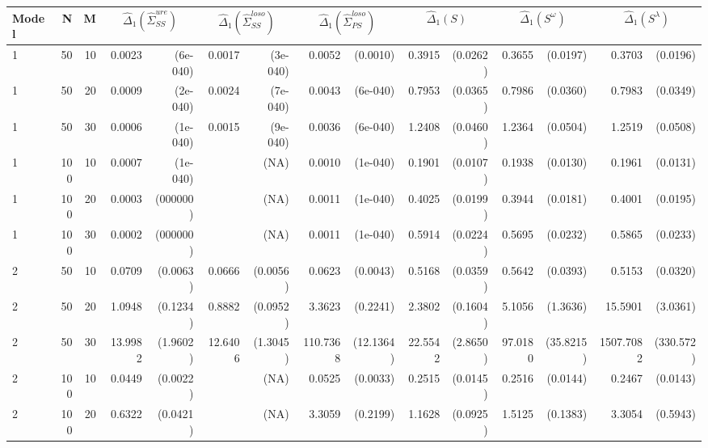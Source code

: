 \begin{table}[ht]
\centering
\begin{small}
\begin{tabular}{lrrrrrrrrrrrrrr}
Model & N & M & \multicolumn{2}{c}{$\hat{\Delta}_1(\hat{\Sigma}^{ure}_{SS})$} &  \multicolumn{2}{c}{$\hat{\Delta}_1(\hat{\Sigma}^{loso}_{SS})$}&  \multicolumn{2}{c}{$\hat{\Delta}_1(\hat{\Sigma}^{loso}_{PS})$} & \multicolumn{2}{c}{$\hat{\Delta}_1(S)$} &  \multicolumn{2}{c}{$\hat{\Delta}_1(S^\omega)$}  &  \multicolumn{2}{c}{$\hat{\Delta}_1(S^\lambda)$}   \\ 
  \hline
1 & 50 & 10 & 0.0023 & (6e-040) & 0.0017 & (3e-040) & 0.0052 & (0.0010) & 0.3915 & (0.0262) & 0.3655 & (0.0197) & 0.3703 & (0.0196) \\ 
  1 & 50 & 20 & 0.0009 & (2e-040) & 0.0024 & (7e-040) & 0.0043 & (6e-040) & 0.7953 & (0.0365) & 0.7986 & (0.0360) & 0.7983 & (0.0349) \\ 
  1 & 50 & 30 & 0.0006 & (1e-040) & 0.0015 & (9e-040) & 0.0036 & (6e-040) & 1.2408 & (0.0460) & 1.2364 & (0.0504) & 1.2519 & (0.0508) \\ 
  1 & 100 & 10 & 0.0007 & (1e-040) &  & (NA) & 0.0010 & (1e-040) & 0.1901 & (0.0107) & 0.1938 & (0.0130) & 0.1961 & (0.0131) \\ 
  1 & 100 & 20 & 0.0003 & (000000) &  & (NA) & 0.0011 & (1e-040) & 0.4025 & (0.0199) & 0.3944 & (0.0181) & 0.4001 & (0.0195) \\ 
  1 & 100 & 30 & 0.0002 & (000000) &  & (NA) & 0.0011 & (1e-040) & 0.5914 & (0.0224) & 0.5695 & (0.0232) & 0.5865 & (0.0233) \\ 
  2 & 50 & 10 & 0.0709 & (0.0063) & 0.0666 & (0.0056) & 0.0623 & (0.0043) & 0.5168 & (0.0359) & 0.5642 & (0.0393) & 0.5153 & (0.0320) \\ 
  2 & 50 & 20 & 1.0948 & (0.1234) & 0.8882 & (0.0952) & 3.3623 & (0.2241) & 2.3802 & (0.1604) & 5.1056 & (1.3636) & 15.5901 & (3.0361) \\ 
  2 & 50 & 30 & 13.9982 & (1.9602) & 12.6406 & (1.3045) & 110.7368 & (12.1364) & 22.5542 & (2.8650) & 97.0180 & (35.8215) & 1507.7082 & (330.572) \\ 
  2 & 100 & 10 & 0.0449 & (0.0022) &  & (NA) & 0.0525 & (0.0033) & 0.2515 & (0.0145) & 0.2516 & (0.0144) & 0.2467 & (0.0143) \\ 
  2 & 100 & 20 & 0.6322 & (0.0421) &  & (NA) & 3.3059 & (0.2199) & 1.1628 & (0.0925) & 1.5125 & (0.1383) & 3.3054 & (0.5943) \\ 

\end{tabular}
\end{small}
\end{table}
